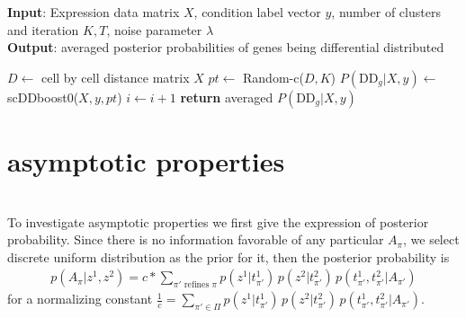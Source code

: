 \documentclass[11pt]{amsart}
\begin{document}
\begin{algorithm}
\caption{}\label{alg:scDDboost-robust}
\raggedright\hspace*{\algorithmicindent} \textbf{Input}: Expression data matrix $X$, condition label vector  $y$, number of clusters and iteration $K, T$, noise parameter $\lambda$   \\
\hspace*{\algorithmicindent} \textbf{Output}: averaged posterior probabilities of genes being differential distributed 
\begin{algorithmic}[1]
\State $D\gets$ cell by cell distance matrix $X$
\State $pt\gets$ Random-c($D, K$)
\State $P(\text{DD}_g | X, y) \gets$ scDDboost0($X, y, pt$)
\State $i\gets i + 1$
\EndFor
\State \textbf{return} averaged $P(\text{DD}_g |X, y)$
\EndProcedure
\end{algorithmic}
\end{algorithm}




\section{asymptotic properties}\hfill\\

To investigate asymptotic properties we first give the expression of posterior probability. Since there is no information favorable of any particular $A_\pi$, we select discrete uniform distribution as the prior for it, then the posterior probability is
\begin{align}
p(A_\pi | z^1, z^2) = c*\sum_{\pi' \text{ refines } \pi} p(z^1 | t^1_{\pi'})\, p(z^2|  t^2_{\pi'} )
 \, p( t^1_{\pi'}, t^2_{\pi'} | A_{\pi'} )
\end{align}
for a normalizing constant $\frac{1}{c} = \underset{\pi' \in \Pi}\sum p(z^1 | t^1_{\pi'})\, p(z^2|  t^2_{\pi'} )
 \, p( t^1_{\pi'}, t^2_{\pi'} | A_{\pi'} )$.
 
\end{document}
